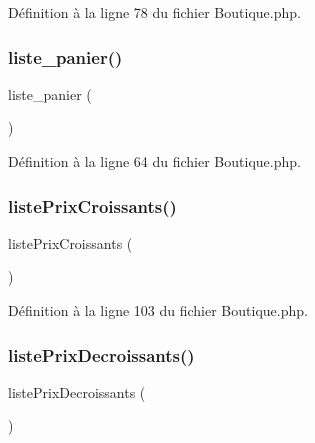 Définition à la ligne 78 du fichier Boutique.\+php.

\mbox{\label{class_boutique_ab968ad3c25b2d44e195fecd0edf93fd9}} 
\subsubsection{\texorpdfstring{liste\+\_\+panier()}{liste\_panier()}}
{\footnotesize\ttfamily liste\+\_\+panier (\begin{DoxyParamCaption}{ }\end{DoxyParamCaption})}



Définition à la ligne 64 du fichier Boutique.\+php.

\mbox{\label{class_boutique_ad7364067394e24f1b2f072e796421e41}} 
\subsubsection{\texorpdfstring{liste\+Prix\+Croissants()}{listePrixCroissants()}}
{\footnotesize\ttfamily liste\+Prix\+Croissants (\begin{DoxyParamCaption}{ }\end{DoxyParamCaption})}



Définition à la ligne 103 du fichier Boutique.\+php.

\mbox{\label{class_boutique_aec90b65cd01cf52d28896b79269b5a35}} 
\subsubsection{\texorpdfstring{liste\+Prix\+Decroissants()}{listePrixDecroissants()}}
{\footnotesize\ttfamily liste\+Prix\+Decroissants (\begin{DoxyParamCaption}{ }\end{DoxyParamCaption})}



